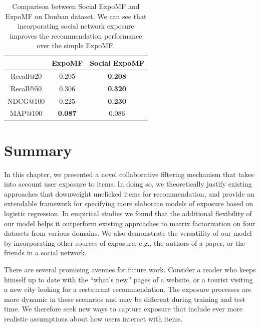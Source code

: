 \begin{table}
\centering
\begin{tabular}{ c c c }
\toprule
            & ExpoMF & Social ExpoMF \\ \midrule
  Recall@20 & 0.205 & \textbf{0.208}     \\ 
  Recall@50 & 0.306 & \textbf{0.320}   	 \\ 
  NDCG@100  & 0.225 & \textbf{0.230}    \\ 
  MAP@100   & \textbf{0.087} & 0.086    \\ 
\bottomrule 
\end{tabular}
\caption{Comparison between Social ExpoMF and ExpoMF on Douban dataset. We can see that incorporating social network exposure improves the recommendation performance over the simple ExpoMF.}
\label{chpt:expomf:tab:si_social_results}
\end{table}

\section{Summary}

%
%
%


In this chapter, we presented a novel collaborative filtering mechanism
that takes into account user exposure to items. 
In doing so, we theoretically justify existing approaches that 
downweight unclicked items for recommendation, 
and provide an extendable framework 
for specifying more elaborate models of exposure based on logistic regression. 
In empirical studies we found 
that the additional flexibility of our model 
helps it outperform existing approaches to 
matrix factorization on four datasets from various domains. We also demonstrate the versatility of our model by incorporating other sources of exposure, e.g., the authors of a paper, or the friends in a social network. 

There are several promising avenues for future work. 
Consider a reader who keeps himself up to date with the ``what's new'' pages 
of a website, or 
a tourist visiting a new city looking for a restaurant recommendation. 
The exposure processes are more dynamic in these scenarios 
and may be different during training and test time. 
We therefore seek new ways to capture exposure that include 
ever more realistic assumptions about how users interact with items. 

